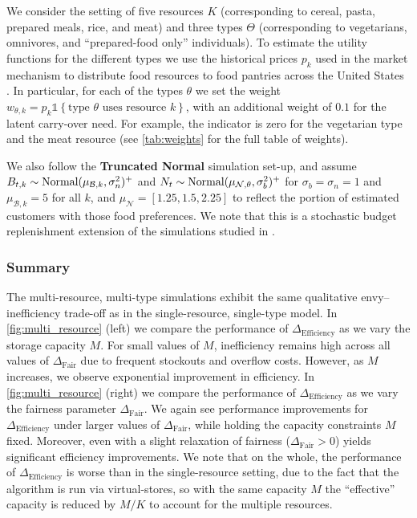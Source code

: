 \documentclass[mnsc,nonblindrev]{informs3}
\newcommand{\NDist}{\mathcal{N}}
\newcommand{\BDist}{\mathcal{B}}
\newcommand{\Ind}[1]{\mathds{1}\left\{ #1 \right\}}
\newcommand{\Deff}{\Delta_{\text{Efficiency}}\xspace}
\newcommand{\Dfair}{\Delta_{\text{Fair}}\xspace}
\newcommand{\Norm}{\textup{Normal}}
\renewcommand{\paragraph}[1]{\subsubsection*{#1}}
\begin{document}
\begin{APPENDICES}
We consider the setting of five resources $K$ (corresponding to cereal, pasta, prepared meals, rice, and meat) and three types $\Theta$ (corresponding to vegetarians, omnivores, and ``prepared-food only'' individuals).  To estimate the utility functions for the different types we use the historical prices $p_k$ used in the market mechanism to distribute food resources to food pantries across the United States \citep{prendergast2017food}.  In particular, for each of the types $\theta$ we set the weight $w_{\theta, k} = p_k \Ind{\text{type } \theta \text{ uses resource } k}$, with an additional weight of $0.1$ for the latent carry-over need.  For example, the indicator is zero for the vegetarian type and the meat resource (see \cref{tab:weights} for the full table of weights).

We also follow the {\bf Truncated Normal} simulation set-up, and assume $B_{t,k} \sim \Norm(\mu_{\BDist, k}, \sigma_n^2)^+$ and $N_t \sim \Norm(\mu_{\NDist, \theta}, \sigma_b^2)^+$ for $\sigma_b = \sigma_n = 1$ and $\mu_{\BDist, k} = 5$ for all $k$, and $\mu_{\NDist} = [1.25, 1.5, 2.25]$ to reflect the portion of estimated customers with those food preferences.  We note that this is a stochastic budget replenishment extension of the simulations studied in \citet{sinclair2021sequential}.




\paragraph{Summary} The multi-resource, multi-type simulations exhibit the same qualitative envy–inefficiency trade-off as in the single-resource, single-type model.  
In \cref{fig:multi_resource} (left) we compare the performance of $\Deff$ as we vary the storage capacity $M$.  For small values of $M$, inefficiency remains high across all values of $\Dfair$ due to frequent stockouts and overflow costs. However, as $M$ increases, we observe exponential improvement in efficiency.
In \cref{fig:multi_resource} (right) we compare the performance of $\Deff$ as we vary the fairness parameter $\Dfair$.  We again see performance improvements for $\Deff$ under larger values of $\Dfair$, while holding the capacity constraints $M$ fixed.  Moreover, even with a slight relaxation of fairness ($\Dfair > 0$) yields significant efficiency improvements.  We note that on the whole, the performance of $\Deff$ is worse than in the single-resource setting, due to the fact that the algorithm is run via virtual-stores, so with the same capacity $M$ the ``effective'' capacity is reduced by $M/K$ to account for the multiple resources.


\end{APPENDICES}
\end{document}
